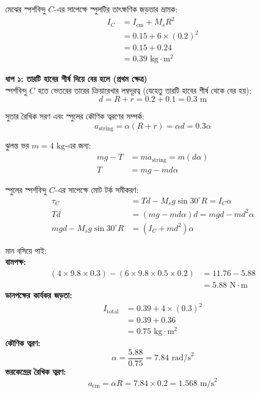 \documentclass[12pt, a4paper]{article}
\begin{document}
\begin{tcolorbox}[solutionbox={সমাধান (Solution)}]
    \noindent
    মেঝের স্পর্শবিন্দু $C$-এর সাপেক্ষে স্পুলটির তাৎক্ষণিক জড়তার ভ্রামক:
    \begin{align*}
        I_C &= I_{\text{cm}} + M_s R^2 \\
        &= 0.15 + 6 \times (0.2)^2 \\
        &= 0.15 + 0.24 \\
        &= 0.39\text{ kg}\cdot\text{m}^2
    \end{align*}
    
    \vspace{0.3em}
    \noindent\textbf{ধাপ ১: তারটি হাবের শীর্ষ দিয়ে বের হলে (প্রথম ক্ষেত্র)} \\
    স্পর্শবিন্দু $C$ হতে ভেতরের তারের ক্রিয়ারেখার লম্বদূরত্ব (যেহেতু তারটি হাবের শীর্ষ থেকে বের হয়):
    \[ d = R + r = 0.2 + 0.1 = 0.3\text{ m} \]
    
    সুতার রৈখিক সরণ এবং স্পুলের কৌণিক ত্বরণের সম্পর্ক:
    \[ a_{\text{string}} = \alpha (R + r) = \alpha d = 0.3 \alpha \]
    
    ঝুলন্ত ভর $m = 4\text{ kg}$-এর জন্য:
    \begin{align*}
        m g - T &= m a_{\text{string}} = m (d \alpha) \\
        T &= m g - m d \alpha
    \end{align*}
    
    স্পুলের স্পর্শবিন্দু $C$-এর সাপেক্ষে মোট টর্ক সমীকরণ:
    \begin{align*}
        \tau_C &= T d - M_s g \sin 30^\circ R = I_C \alpha \\
        T d &= (m g - m d \alpha) d = m g d - m d^2 \alpha \\
        m g d - M_s g \sin 30^\circ R &= (I_C + m d^2) \alpha
    \end{align*}
    
    মান বসিয়ে পাই: \\
    \textbf{বামপক্ষ:}
    \begin{align*}
        (4 \times 9.8 \times 0.3) - (6 \times 9.8 \times 0.5 \times 0.2) &= 11.76 - 5.88 \\
        &= 5.88\text{ N}\cdot\text{m}
    \end{align*}
    \textbf{ডানপক্ষের কার্যকর জড়তা:}
    \begin{align*}
        I_{\text{total}} &= 0.39 + 4 \times (0.3)^2 \\
        &= 0.39 + 0.36 \\
        &= 0.75\text{ kg}\cdot\text{m}^2
    \end{align*}
    \textbf{কৌণিক ত্বরণ:}
    \[ \alpha = \frac{5.88}{0.75} = 7.84\text{ rad/s}^2 \]
    \textbf{ভরকেন্দ্রের রৈখিক ত্বরণ:}
    \[ a_{\text{cm}} = \alpha R = 7.84 \times 0.2 = 1.568\text{ m/s}^2 \]
    

\end{tcolorbox}
\end{document}
